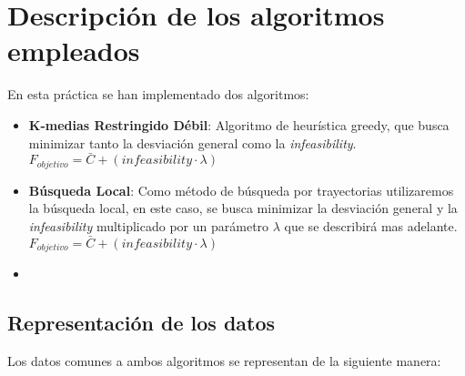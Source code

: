 \chapter{Descripción de los algoritmos empleados}

En esta práctica se han implementado dos algoritmos:
\begin{itemize}
   \item \textbf{K-medias Restringido Débil}: Algoritmo de heurística greedy, que busca minimizar tanto la desviación general como la \emph{infeasibility}. $ F_{objetivo} = \bar{C} + (infeasibility \cdot \lambda) $
   \item \textbf{Búsqueda Local}: Como método de búsqueda por trayectorias utilizaremos la búsqueda local, en este caso, se busca minimizar la desviación general y la \emph{infeasibility} multiplicado por un parámetro $ \lambda $ que se describirá mas adelante. $ F_{objetivo} = \bar{C} + (infeasibility \cdot \lambda) $
   \item
\end{itemize}

\section{Representación de los datos}
Los datos comunes a ambos algoritmos se representan de la siguiente manera:

